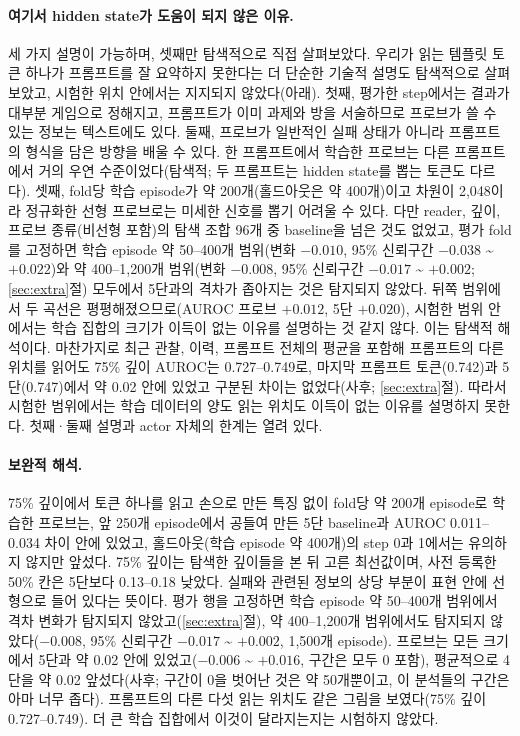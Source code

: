 \documentclass[11pt]{article}
\begin{document}
\paragraph{여기서 hidden state가 도움이 되지 않은 이유.} 세 가지 설명이 가능하며, 셋째만 탐색적으로 직접 살펴보았다. 우리가 읽는 템플릿 토큰 하나가 프롬프트를 잘 요약하지 못한다는 더 단순한 기술적 설명도 탐색적으로 살펴보았고, 시험한 위치 안에서는 지지되지 않았다(아래). 첫째, 평가한 step에서는 결과가 대부분 게임으로 정해지고, 프롬프트가 이미 과제와 방을 서술하므로 프로브가 쓸 수 있는 정보는 텍스트에도 있다.
둘째, 프로브가 일반적인 실패 상태가 아니라 프롬프트의 형식을 담은 방향을 배울 수 있다. 한 프롬프트에서 학습한 프로브는 다른 프롬프트에서 거의 우연 수준이었다(탐색적; 두 프롬프트는 hidden state를 뽑는 토큰도 다르다).
셋째, fold당 학습 episode가 약 200개(홀드아웃은 약 400개)이고 차원이 2,048이라 정규화한 선형 프로브로는 미세한 신호를 뽑기 어려울 수 있다. 다만 reader, 깊이, 프로브 종류(비선형 포함)의 탐색 조합 96개 중 baseline을 넘은 것도 없었고, 평가 fold를 고정하면 학습 episode 약 50--400개 범위(변화 $-0.010$, 95\% 신뢰구간 $-0.038$ \textasciitilde{} $+0.022$)와 약 400--1,200개 범위(변화 $-0.008$, 95\% 신뢰구간 $-0.017$ \textasciitilde{} $+0.002$; \ref{sec:extra}절) 모두에서 5단과의 격차가 좁아지는 것은 탐지되지 않았다. 뒤쪽 범위에서 두 곡선은 평평해졌으므로(AUROC 프로브 $+0.012$, 5단 $+0.020$), 시험한 범위 안에서는 학습 집합의 크기가 이득이 없는 이유를 설명하는 것 같지 않다. 이는 탐색적 해석이다. 마찬가지로 최근 관찰, 이력, 프롬프트 전체의 평균을 포함해 프롬프트의 다른 위치를 읽어도 75\% 깊이 AUROC는 0.727--0.749로, 마지막 프롬프트 토큰(0.742)과 5단(0.747)에서 약 0.02 안에 있었고 구분된 차이는 없었다(사후; \ref{sec:extra}절). 따라서 시험한 범위에서는 학습 데이터의 양도 읽는 위치도 이득이 없는 이유를 설명하지 못한다. 첫째·둘째 설명과 actor 자체의 한계는 열려 있다.

\paragraph{보완적 해석.} 75\% 깊이에서 토큰 하나를 읽고 손으로 만든 특징 없이 fold당 약 200개 episode로 학습한 프로브는, 앞 250개 episode에서 공들여 만든 5단 baseline과 AUROC 0.011--0.034 차이 안에 있었고, 홀드아웃(학습 episode 약 400개)의 step 0과 1에서는 유의하지 않지만 앞섰다. 75\% 깊이는 탐색한 깊이들을 본 뒤 고른 최선값이며, 사전 등록한 50\% 칸은 5단보다 0.13--0.18 낮았다. 실패와 관련된 정보의 상당 부분이 표현 안에 선형으로 들어 있다는 뜻이다. 평가 행을 고정하면 학습 episode 약 50--400개 범위에서 격차 변화가 탐지되지 않았고(\ref{sec:extra}절), 약 400--1,200개 범위에서도 탐지되지 않았다($-0.008$, 95\% 신뢰구간 $-0.017$ \textasciitilde{} $+0.002$, 1,500개 episode). 프로브는 모든 크기에서 5단과 약 0.02 안에 있었고($-0.006$ \textasciitilde{} $+0.016$, 구간은 모두 0 포함), 평균적으로 4단을 약 0.02 앞섰다(사후; 구간이 0을 벗어난 것은 약 50개뿐이고, 이 분석들의 구간은 아마 너무 좁다). 프롬프트의 다른 다섯 읽는 위치도 같은 그림을 보였다(75\% 깊이 0.727--0.749). 더 큰 학습 집합에서 이것이 달라지는지는 시험하지 않았다.
\end{document}

